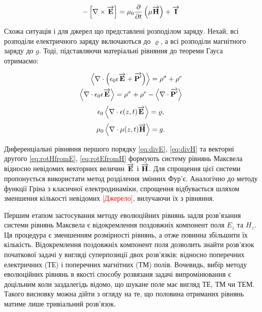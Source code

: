\begin{equation} \label{eq:rotEfromH} 
- \left[ \nabla \times \overrightarrow{\mathbf E} \right] = 
\mu_0 \frac{\partial }{\partial t} \left( \mu \overrightarrow{\mathbf H} \right) + \overrightarrow{\mathbf I}
\end{equation}

Схожа ситуація і для джерел що представлені розподілом заряду. Нехай,
всі розподіли електричного заряду включаються до $ \varrho $, а всі розподіли 
магнітного заряду до $ g $. Тоді, підставляючи матеріальні рівняння до теореми 
Гауса отримаємо:

\textcolor{blue}{ \begin{equation*} \begin{aligned}
\left< \nabla \cdot  \left( \epsilon_0 \epsilon \overrightarrow{\mathbf E} + 
\overrightarrow{\mathbf P^\prime} \right)  \right> = \rho^\sigma + \rho^e \\
\left< \nabla \cdot  \epsilon_0 \epsilon \overrightarrow{\mathbf E}  \right> = \rho^\sigma + \rho^e -
\left< \nabla \cdot  \overrightarrow{\mathbf P^\prime}  \right>
\end{aligned} \end{equation*} }
%
\begin{equation} \label{eq:divE} 
\epsilon_0 \left< \nabla \cdot  \epsilon(z,t) \overrightarrow{\mathbf E}  \right> = \varrho,
\end{equation}
%
\begin{equation} \label{eq:divH}
\mu_0 \left< \nabla \cdot  \mu(z,t) \overrightarrow{\mathbf H}  \right> = g.
\end{equation}

Диференціальні рівняння першого порядку \eqref{eq:divE}, \eqref{eq:divH} та 
векторні другого \eqref{eq:rotHfromE}, \eqref{eq:rotEfromH} формують систему 
рівнянь Максвела відносно невідомих векторних величин $ \overrightarrow{\mathbf E} $ і 
$ \overrightarrow{\mathbf H} $. Для спрощення цієї системи пропонується використати метод 
розділення змінних Фур'є. Аналогічно до методу функції Гріна з класичної 
електродинаміки, спрощення відбувається шляхом зменшення кількості невідомих 
\textcolor{red}{[Джерело]}, вилучаючи їх з рівняння.

Першим етапом застосування методу еволюційних рівнянь задля розв'язання системи
рівнянь Максвела є відокремлення поздовжніх компонент поля $ E_z $ та $ H_z $.
Ця процедура є зменшенням розмірності рівнянь, а отже повинна збільшити їх 
кількість. Відокремлення поздовжніх компонент поля дозволить знайти розв'язок 
початкової задачі у вигляді суперпозиції двох розв'язків: відносно поперечних 
електричних (ТЕ) і поперечних магнітних (ТМ) полів. Вочевидь, вибір методу 
еволюційних рівнянь в якості способу розвязаня задачі випромінювання є 
доцільним коли заздалегідь відомо, що шукане поле має вигляд ТЕ, ТМ чи ТЕМ. 
Такого висновку можна дійти з огляду на те, що половина отриманих рівнянь 
матиме лише тривіальний розв'язок.

